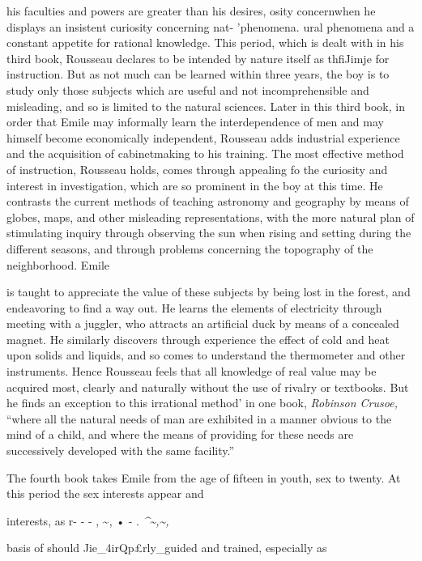 \documentclass[]{book}
\begin{document}
his faculties and powers are greater than his desires, osity concernwhen he displays an insistent curiosity concerning nat- 'phenomena. ural phenomena and a constant appetite for rational knowledge. This period, which is dealt with in his third book, Rousseau declares to be intended by nature itself as thfiJimje for instruction. But as not much can be learned within three years, the boy is to study only those subjects which are useful and not incomprehensible and misleading, and so is limited to the natural sciences. Later in this third book, in order that Emile may informally learn the interdependence of men and may himself become economically independent, Rousseau adds industrial experience and the acquisition of cabinetmaking to his training. The most effective method of instruction, Rousseau holds, comes through appealing fo the curiosity and interest in investigation, which are so prominent in the boy at this time. He contrasts the current methods of teaching astronomy and geography by means of globes, maps, and other misleading representations, with the more natural plan of stimulating inquiry through observing the sun when rising and setting during the different seasons, and through problems concerning the topography of the neighborhood. Emile

is taught to appreciate the value of these subjects by being lost in the forest, and endeavoring to find a way out. He learns the elements of electricity through meeting with a juggler, who attracts an artificial duck by means of a concealed magnet. He similarly discovers through experience the effect of cold and heat upon solids and liquids, and so comes to understand the thermometer and other instruments. Hence Rousseau feels that all knowledge of real value may be acquired most, clearly and naturally without the use of rivalry or textbooks. But he finds an exception to this irrational method' in one book, \emph{Robinson Crusoe,} ``where all the natural needs of man are exhibited in a manner obvious to the mind of a child, and where the means of providing for these needs are successively developed with the same facility.''

The fourth book takes Emile from the age of fifteen in youth, sex to twenty. At this period the sex interests appear and

interests, as r- - - , \textasciitilde{}, • - . \emph{\^{}\textasciitilde{},\textasciitilde{},}

basis of should Jie\_4irQp£rly\_guided and trained, especially as
\end{document}
